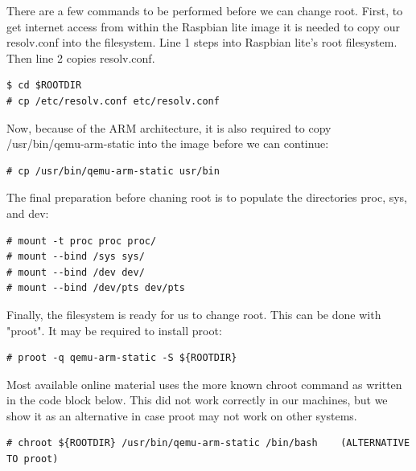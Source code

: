 There are a few commands to be performed before we can change root.
First, to get internet access from within the Raspbian lite image it is needed
to copy our resolv.conf into the filesystem. Line 1 steps into Raspbian lite's
root filesystem. Then line 2 copies resolv.conf.

\begin{lstlisting}[]
$ cd $ROOTDIR
# cp /etc/resolv.conf etc/resolv.conf
\end{lstlisting}
\FloatBarrier
\vspace{-5mm}

Now, because of the ARM architecture, it is also required to copy
/usr/bin/qemu-arm-static into the image before we can continue:

\begin{lstlisting}[]
# cp /usr/bin/qemu-arm-static usr/bin
\end{lstlisting}
\FloatBarrier
\vspace{-5mm}

The final preparation before chaning root is to populate the directories proc,
sys, and dev:

\begin{lstlisting}[]
# mount -t proc proc proc/
# mount --bind /sys sys/
# mount --bind /dev dev/
# mount --bind /dev/pts dev/pts
\end{lstlisting}
\FloatBarrier
\vspace{-5mm}

Finally, the filesystem is ready for us to change root. This can be done with
"proot". It may be required to install proot:

\begin{lstlisting}[]
# proot -q qemu-arm-static -S ${ROOTDIR}
\end{lstlisting}
\FloatBarrier
\vspace{-5mm}

Most available online material uses the more known chroot command as written in
the code block below. This did not work correctly in our machines, but we show
it as an alternative in case proot may not work on other systems.

\begin{lstlisting}[]
# chroot ${ROOTDIR} /usr/bin/qemu-arm-static /bin/bash    (ALTERNATIVE TO proot)
\end{lstlisting}
\FloatBarrier
\vspace{-5mm}

